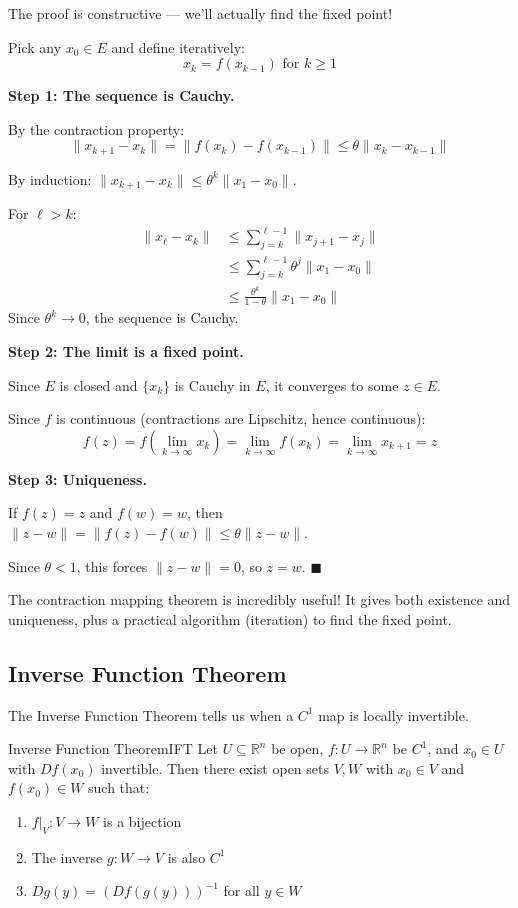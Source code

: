 \documentclass[11pt, letterpaper, openany]{book}
\renewenvironment{proof}[1][\proofname]{%
  \tcolorbox[blanker, breakable, left=1em,
    before skip=1em, after skip=1em,
    borderline west={2pt}{0pt}{MagicTeal!50},
    colback=MagicCream,
    before upper={\textcolor{MagicTeal}{\sffamily\bfseries #1.}\space}
  ]%
}{%
  \hfill\textcolor{MagicTeal}{\ensuremath{\blacksquare}}\endtcolorbox%
}
\begin{document}
\begin{proof}
The proof is constructive --- we'll actually find the fixed point!

Pick any $x_0 \in E$ and define iteratively:
\[x_k = f(x_{k-1}) \text{ for } k \geq 1\]

\textbf{Step 1: The sequence is Cauchy.}

By the contraction property:
\[\|x_{k+1} - x_k\| = \|f(x_k) - f(x_{k-1})\| \leq \theta \|x_k - x_{k-1}\|\]

By induction: $\|x_{k+1} - x_k\| \leq \theta^k \|x_1 - x_0\|$.

For $\ell > k$:
\begin{align*}
\|x_\ell - x_k\| &\leq \sum_{j=k}^{\ell-1} \|x_{j+1} - x_j\| \\
&\leq \sum_{j=k}^{\ell-1} \theta^j \|x_1 - x_0\| \\
&\leq \frac{\theta^k}{1 - \theta} \|x_1 - x_0\|
\end{align*}
Since $\theta^k \to 0$, the sequence is Cauchy.

\textbf{Step 2: The limit is a fixed point.}

Since $E$ is closed and $\{x_k\}$ is Cauchy in $E$, it converges to some $z \in E$.

Since $f$ is continuous (contractions are Lipschitz, hence continuous):
\[f(z) = f(\lim_{k \to \infty} x_k) = \lim_{k \to \infty} f(x_k) = \lim_{k \to \infty} x_{k+1} = z\]

\textbf{Step 3: Uniqueness.}

If $f(z) = z$ and $f(w) = w$, then $\|z - w\| = \|f(z) - f(w)\| \leq \theta \|z - w\|$.

Since $\theta < 1$, this forces $\|z - w\| = 0$, so $z = w$.
\end{proof}

\begin{remark}
The contraction mapping theorem is incredibly useful! It gives both existence and uniqueness, plus a practical algorithm (iteration) to find the fixed point.
\end{remark}

\subsection{Inverse Function Theorem}

The Inverse Function Theorem tells us when a $C^1$ map is locally invertible.

\begin{thm}{Inverse Function Theorem}{IFT}
Let $U \subseteq \mathbb{R}^n$ be open, $f: U \to \mathbb{R}^n$ be $C^1$, and $x_0 \in U$ with $Df(x_0)$ invertible. Then there exist open sets $V, W$ with $x_0 \in V$ and $f(x_0) \in W$ such that:
\begin{enumerate}
    \item $f|_V: V \to W$ is a bijection
    \item The inverse $g: W \to V$ is also $C^1$
    \item $Dg(y) = (Df(g(y)))^{-1}$ for all $y \in W$
\end{enumerate}
\end{thm}
\end{document}
